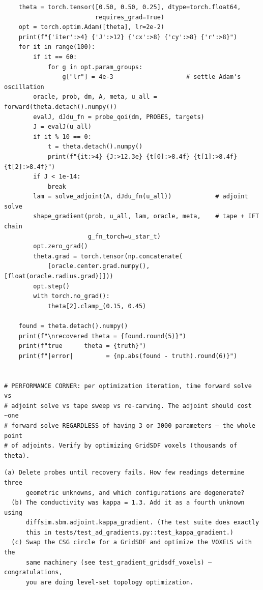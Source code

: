 \begin{lstlisting}
    theta = torch.tensor([0.50, 0.50, 0.25], dtype=torch.float64,
                         requires_grad=True)
    opt = torch.optim.Adam([theta], lr=2e-2)
    print(f"{'iter':>4} {'J':>12} {'cx':>8} {'cy':>8} {'r':>8}")
    for it in range(100):
        if it == 60:
            for g in opt.param_groups:
                g["lr"] = 4e-3                    # settle Adam's oscillation
        oracle, prob, dm, A, meta, u_all = forward(theta.detach().numpy())
        evalJ, dJdu_fn = probe_qoi(dm, PROBES, targets)
        J = evalJ(u_all)
        if it % 10 == 0:
            t = theta.detach().numpy()
            print(f"{it:>4} {J:>12.3e} {t[0]:>8.4f} {t[1]:>8.4f} {t[2]:>8.4f}")
        if J < 1e-14:
            break
        lam = solve_adjoint(A, dJdu_fn(u_all))            # adjoint solve
        shape_gradient(prob, u_all, lam, oracle, meta,    # tape + IFT chain
                       g_fn_torch=u_star_t)
        opt.zero_grad()
        theta.grad = torch.tensor(np.concatenate(
            [oracle.center.grad.numpy(), [float(oracle.radius.grad)]]))
        opt.step()
        with torch.no_grad():
            theta[2].clamp_(0.15, 0.45)

    found = theta.detach().numpy()
    print(f"\nrecovered theta = {found.round(5)}")
    print(f"true      theta = {truth}")
    print(f"|error|         = {np.abs(found - truth).round(6)}")


# PERFORMANCE CORNER: per optimization iteration, time forward solve vs
# adjoint solve vs tape sweep vs re-carving. The adjoint should cost ~one
# forward solve REGARDLESS of having 3 or 3000 parameters — the whole point
# of adjoints. Verify by optimizing GridSDF voxels (thousands of theta).
\end{lstlisting}

\begin{explore}
\begin{verbatim}
(a) Delete probes until recovery fails. How few readings determine three
      geometric unknowns, and which configurations are degenerate?
  (b) The conductivity was kappa = 1.3. Add it as a fourth unknown using
      diffsim.sbm.adjoint.kappa_gradient. (The test suite does exactly
      this in tests/test_ad_gradients.py::test_kappa_gradient.)
  (c) Swap the CSG circle for a GridSDF and optimize the VOXELS with the
      same machinery (see test_gradient_gridsdf_voxels) — congratulations,
      you are doing level-set topology optimization.
\end{verbatim}
\end{explore}

